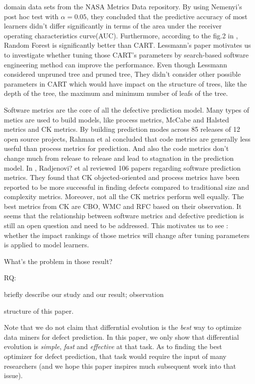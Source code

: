 \documentclass{sig-alternative}
\begin{document}
domain data sets from the NASA Metrics Data repository. By using Nemenyi's post hoc test 
with $\alpha = 0.05$, they concluded that the predictive accuracy of most learners didn't differ 
significantly in terms of the area under the receiver operating characteristics curve(AUC). 
Furthermore, according to the fig.2 in \cite{lessmann2008benchmarking}, Random Forest is 
significantly better than CART. Lessmann's paper motivates us to investigate whether tuning 
those CART's parameters by search-based software engineering method can improve the 
performance. Even though Lessmann considered unpruned tree and pruned tree, They didn't 
consider other possible parameters in CART which would have impact on the structure of 
trees, like the depth of the tree, the maximum and minimum number of leafs of the tree.

Software metrics are the core of all the defective prediction model. Many types of metics
are used to build models, like process metrics, McCabe and Halsted metrics  and CK metrics.
By building prediction modes across 85 releases of 12 open source projects, Rahman et al
\cite{rahman2013how}  concluded that code metrics are generally less useful than process
metrics for prediction. And also the code metrics don't change much from release to release
and lead to stagnation in the prediction model. In \cite{Radjenovi?20131397}, Radjenovi? et al
\cite{Radjenovi?20131397} reviewed 106 papers regarding software prediction metrics. They found
that CK objected-oriented and process metrics have been reported to be more successful in
finding defects compared to traditional size and complexity metrics. Moreover, not all the CK
metrics perform well equally. The best metrics from CK are CBO, WMC and RFC based on their 
observation. It seems that the relationship between software metrics and defective prediction is
still an open question and need to be addressed. This motivates us to see : whether the impact
rankings of those metrics will change after tuning parameters
is applied to model learners.



What's the problem in those result?

RQ:

briefly describe our study and  our result; observation

structure of this paper.

Note that we do not claim that differntial evolution is the {\em best} way to
optimize data miners for defect prediction. In this paper, we only show that
differential evolution is {\em simple}, {\em fast} and {\em effective} at that task. As to   finding the best optimizer for defect prediction, that task would require
the input of many researchers (and we hope this paper inspires
much subsequent work into that issue).
\end{document}

